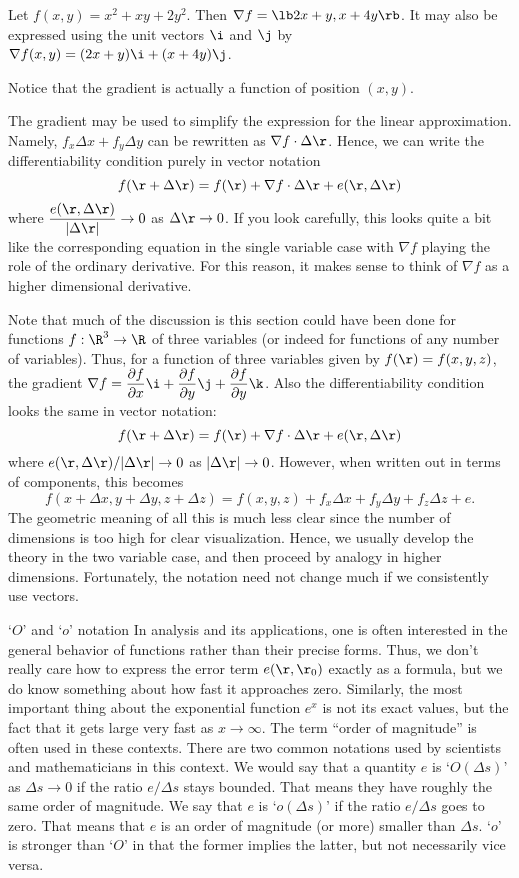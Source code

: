Let  $f(x,y) = x^2 + xy + 2y^2$.  Then $\nabla f = \lb
 2x + y, x + 4y \rb$.  It may also be expressed using the unit
vectors $\i$ and $\j$ by
$\nabla f(x,y) = (2x + y)\i + (x + 4y)\j$.
\endexample

Notice that the gradient is actually a function of position $(x,y)$.

The gradient may be used to simplify the expression for the
linear approximation.  Namely,
$f_x\Delta x + f_y\Delta y$ can be
rewritten as $\nabla f\cdot \Delta \r$.  Hence, we can
write the differentiability condition purely in vector notation
$$
  f(\r + \Delta \r) = f(\r) + \nabla f\cdot \Delta \r + e(\r,\Delta \r)
$$
where $\dfrac{e(\r,\Delta \r)}{|\Delta \r|} \to 0$  as $\Delta\r \to 0$.
If you look carefully, this looks quite a bit like the corresponding
equation in the single variable case with $\nabla f$ playing the
role of the ordinary derivative.  For this reason, it makes sense
to think of $\nabla f$ as a higher dimensional derivative.

Note that much of the discussion is this section could have been
done for functions $f:\R^3 \to \R$ of three variables (or indeed
for functions of any number of variables).  Thus, for a function
of three variables given by $f(\r) = f(x,y,z)$, the gradient
$\nabla f = \dfrac{\partial f}{\partial x} \i
+
\dfrac{\partial f}{\partial y} \j
+ \dfrac{\partial f}{\partial y} \k$.
Also the differentiability condition looks the same in vector
notation:
$$
    f(\r + \Delta \r) = f(\r) + \nabla f\cdot \Delta \r + e(\r,\Delta \r)
$$
where   $e(\r,\Delta \r)/|\Delta \r| \to 0$ as $|\Delta \r| \to 0$.
However, when written out in terms of components, this becomes
$$
    f(x+ \Delta x,y + \Delta y,z + \Delta z) = f(x,y,z) +
           f_x\Delta x  + f_y\Delta y
      + f_z\Delta z  + e.
$$
The geometric meaning of all this is much less clear since the
number of dimensions is too high for clear visualization.   Hence,
we usually develop the theory in the two variable case, and then
proceed by analogy in higher dimensions.  Fortunately, the
notation need not change much if we consistently use vectors.

\subhead `$O$' and `$o$' notation \endsubhead
In analysis and its applications, one is often interested in the
general behavior of functions rather than their precise forms.
Thus, we don't really care how to express the error term $e(\r, \r_0)$
exactly as a formula, but we do know something about how fast it
approaches zero.  Similarly, the most important thing about the
exponential function $e^x$ is not its exact values, but the fact that
it gets large very fast as $x \to \infty$.    The term
``order of magnitude'' is often used in these contexts.  There are
%
%
%
two common notations used by scientists and mathematicians in this
context.    We would say that a quantity $e$ is `$O(\Delta s)$'
 as $\Delta s \to 0$ if the ratio $e/\Delta s$ stays bounded.
That means they have roughly the same order of magnitude.  We say
that $e$ is `$o(\Delta s)$' if the ratio $e/\Delta s$ goes to
zero.   That means that $e$ is an order of magnitude (or more) smaller
than  $\Delta s$.  `$o$' is stronger than `$O$' in that the former
implies the latter, but not necessarily vice versa.

